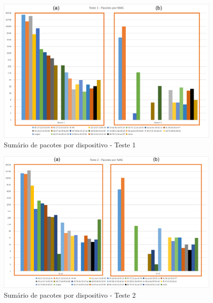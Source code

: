 \begin{figure}[htb]
	\centering
	\caption{\label{fig-mg4-noise-t1}Sumário de pacotes por dispositivo - Teste 1}
	\includegraphics[height=0.32\textheight,width=1\textwidth]{060-testes/data-analisis/distance-mg4plus-netflix/Teste1.png}
\end{figure}

\begin{figure}[htb]
	\centering
	\caption{\label{fig-mg4-noise-t2}Sumário de pacotes por dispositivo - Teste 2}
	\includegraphics[height=0.32\textheight,width=1\textwidth]{060-testes/data-analisis/distance-mg4plus-netflix/Teste2.png}
\end{figure}

